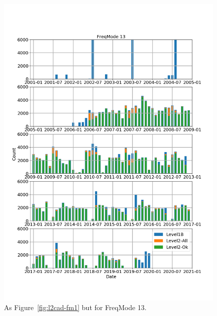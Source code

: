 \begin{figure}[t]
\centering
\includegraphics[width=1.0\textwidth]{l2cad-fm13.png}
\caption{As Figure~\ref{fig:l2cad-fm1} but for FreqMode 13.}
\label{fig:l2cad-fm13}
\end{figure}

